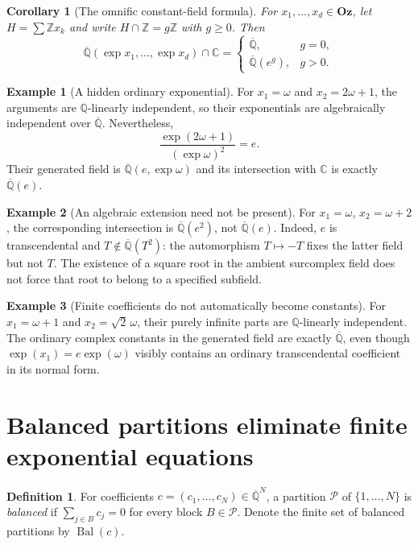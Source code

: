 \documentclass[11pt,letterpaper]{article}
\numberwithin{equation}{section}
\newtheorem{corollary}[corollary]{Corollary}
\theoremstyle{definition}
\newtheorem{definition}[definition]{Definition}
\newtheorem{example}[example]{Example}
\theoremstyle{remark}
\newcommand{\Oz}{\mathbf{Oz}}
\newcommand{\Z}{\mathbb Z}
\newcommand{\Q}{\mathbb Q}
\newcommand{\C}{\mathbb C}
\newcommand{\Qb}{\overline{\mathbb Q}}
\newcommand{\bal}{\operatorname{Bal}}
\begin{document}
\begin{corollary}[The omnific constant-field formula]\label{exr:cor:ozconstants}
For $x_1,\ldots,x_d\in\Oz$, let $H=\sum\Z x_k$ and write
$H\cap\Z=g\Z$ with $g\geq0$. Then
\begin{equation}
 \Qb(\exp x_1,\ldots,\exp x_d)\cap\C
 =\begin{cases} \Qb,&g=0,\\ \Qb(e^g),&g>0. \end{cases}
\end{equation}
\end{corollary}

\begin{example}[A hidden ordinary exponential]
For $x_1=\omega$ and $x_2=2\omega+1$, the arguments are $\Q$-linearly independent,
so their exponentials are algebraically independent over $\Qb$. Nevertheless,
\begin{equation}
 \frac{\exp(2\omega+1)}{(\exp\omega)^2}=e.
\end{equation}
Their generated field is $\Qb(e,\exp\omega)$ and its intersection with $\C$ is
exactly $\Qb(e)$.
\end{example}

\begin{example}[An algebraic extension need not be present]
For $x_1=\omega$, $x_2=\omega+2$, the corresponding intersection is
$\Qb(e^2)$, not $\Qb(e)$. Indeed, $e$ is transcendental and
$T\notin\Qb(T^2)$: the automorphism $T\mapsto-T$ fixes the latter field but not
$T$. The existence of a square root in the ambient surcomplex field does not force
that root to belong to a specified subfield.
\end{example}

\begin{example}[Finite coefficients do not automatically become constants]
For $x_1=\omega+1$ and $x_2=\sqrt2\,\omega$, their purely infinite parts are
$\Q$-linearly independent. The ordinary complex constants in the generated field
are exactly $\Qb$, even though $\exp(x_1)=e\exp(\omega)$ visibly contains an ordinary
transcendental coefficient in its normal form.
\end{example}

\section{Balanced partitions eliminate finite exponential equations}\label{exr:sec:partitions}
\begin{definition}
For coefficients $c=(c_1,\ldots,c_N)\in\Qb^N$, a partition $\mathcal P$ of
$\{1,\ldots,N\}$ is \emph{balanced} if $\sum_{j\in B}c_j=0$ for every block
$B\in\mathcal P$. Denote the finite set of balanced partitions by $\bal(c)$.
\end{definition}
\end{document}
